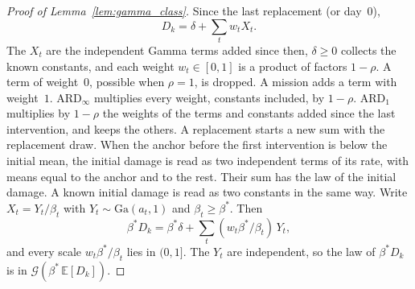 \documentclass[11pt,a4paper]{article}
\theoremstyle{plain}
\theoremstyle{definition}
\theoremstyle{remark}
\begin{document}
\label{prf:lem:gamma_class}
\begin{proof}[Proof of Lemma~\ref{lem:gamma_class}]
Since the last replacement (or day~$0$),
\begin{equation}
  D_k = \delta + \sum_t w_t X_t.
\end{equation}
The $X_t$ are the independent Gamma terms added since then, $\delta \ge 0$ collects the known constants, and each weight $w_t \in [0,1]$ is a product of factors $1-\rho$.
A term of weight~$0$, possible when $\rho = 1$, is dropped.
A mission adds a term with weight~$1$.
$\text{ARD}_\infty$ multiplies every weight, constants included, by $1-\rho$.
$\text{ARD}_1$ multiplies by $1-\rho$ the weights of the terms and constants added since the last intervention, and keeps the others.
A replacement starts a new sum with the replacement draw.
When the anchor before the first intervention is below the initial mean, the initial damage is read as two independent terms of its rate, with means equal to the anchor and to the rest.
Their sum has the law of the initial damage.
A known initial damage is read as two constants in the same way.
Write $X_t = Y_t/\beta_t$ with $Y_t \sim \mathrm{Ga}(a_t, 1)$ and $\beta_t \ge \beta^*$.
Then
\begin{equation}
  \beta^* D_k = \beta^*\delta + \sum_t (w_t\beta^*/\beta_t)\, Y_t,
\end{equation}
and every scale $w_t\beta^*/\beta_t$ lies in $(0,1]$.
The $Y_t$ are independent, so the law of $\beta^* D_k$ is in $\mathcal{G}(\beta^*\,\mathbb{E}[D_k])$.
\end{proof}
\end{document}
